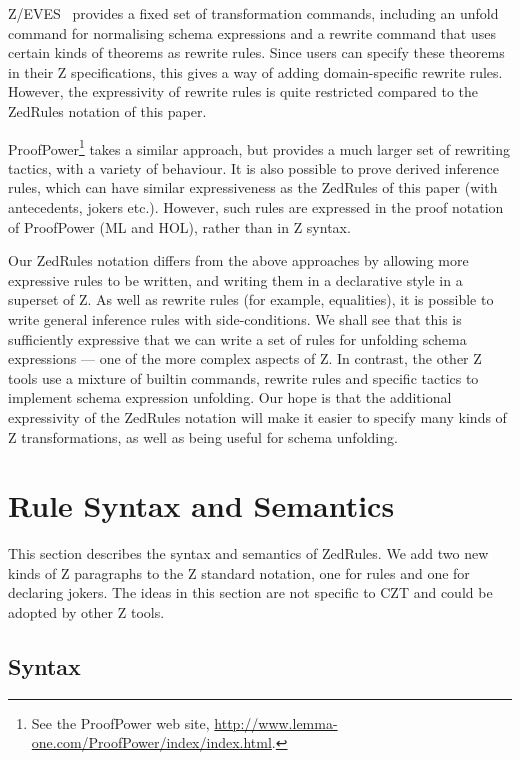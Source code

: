 \documentclass{entcs}
\begin{document}
Z/EVES~\cite{zeves:98} provides a fixed set of transformation
commands, including an unfold command for normalising schema
expressions and a rewrite command that uses certain kinds of theorems
as rewrite rules.  Since users can specify these theorems in their Z
specifications, this gives a way of adding domain-specific rewrite
rules.  However, the expressivity of rewrite rules is quite restricted
compared to the ZedRules notation of this paper.

ProofPower\footnote{See the ProofPower web site,
\url{http://www.lemma-one.com/ProofPower/index/index.html}.} takes a
similar approach, but provides a much larger set of rewriting tactics,
with a variety of behaviour.  It is also possible to prove derived
inference rules, which can have similar expressiveness as the ZedRules
of this paper (with antecedents, jokers etc.).  However, such rules
are expressed in the proof notation of ProofPower (ML and HOL), rather
than in Z syntax.

Our ZedRules notation differs from the above approaches by allowing
more expressive rules to be written, and writing them in a declarative
style in a superset of Z.  As well as rewrite rules (for example,
equalities), it is possible to write general inference rules with
side-conditions.  We shall see that this is sufficiently expressive
that we can write a set of rules for unfolding schema expressions ---
one of the more complex aspects of Z.  In contrast, the other Z tools
use a mixture of builtin commands, rewrite rules and specific tactics
to implement schema expression unfolding.  Our hope is that the
additional expressivity of the ZedRules notation will make it easier
to specify many kinds of Z transformations, as well as being useful
for schema unfolding.


\section{Rule Syntax and Semantics} \label{sec:syntax}

This section describes the syntax and semantics of ZedRules.  We add
two new kinds of Z paragraphs to the Z standard notation, one for
rules and one for declaring jokers.  The ideas in this section are not
specific to CZT and could be adopted by other Z tools.

\subsection{Syntax}
\end{document}
